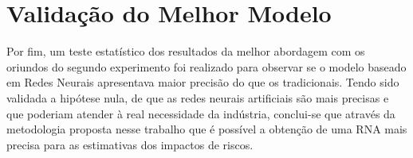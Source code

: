 \section{Validação do Melhor Modelo}

Por fim, um teste estatístico dos resultados da melhor abordagem com os oriundos do segundo experimento foi realizado para observar se o modelo baseado em Redes Neurais apresentava maior precisão do que os tradicionais. Tendo sido validada a hipótese nula, de que as redes neurais artificiais são mais precisas e que poderiam atender à real necessidade da indústria, conclui-se que através da metodologia proposta nesse trabalho que é possível a obtenção de uma RNA mais precisa para as estimativas dos impactos de riscos.

\pagebreak
